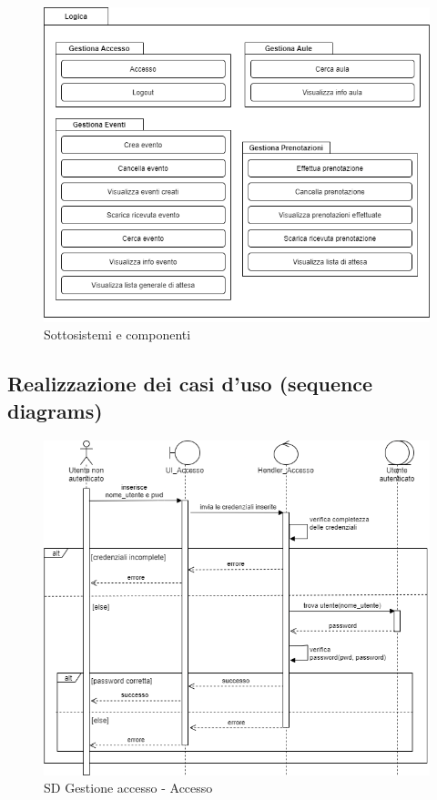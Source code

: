 \documentclass[11pt]{article}
\begin{document}
\begin{figure}[H]
\centering
\includegraphics[width=1\textwidth]{Sottosistemi e componenti.png}
\caption{Sottosistemi e componenti}
\end{figure}

\subsection{Realizzazione dei casi d’uso (sequence diagrams)}
\begin{figure}[H]
\centering
\includegraphics[width=1\textwidth]{SD Gestione accesso - Accesso.png}
\caption{SD Gestione accesso - Accesso}
\end{figure}
\end{document}

